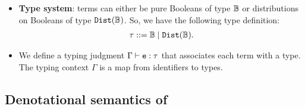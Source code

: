\documentclass{tufte-handout}
\begin{document}
\begin{itemize}
We can encode this scenario as a \disc{} program:

\begin{lstlisting}[mathescape=true]
x $\leftarrow$ flip 0.5; 
y $\leftarrow$ flip 0.5;
observe x $\lor$ y;
return x
\end{lstlisting}

This program outputs the probability distribution:
\begin{align*}
  [\true \mapsto (0.25 + 0.25) / 0.75, \false
\mapsto 0.25 / 0.75]
\end{align*} 

\item \textbf{Type system}: terms can either be pure Booleans of type $\mathbb{B}$ 
or distributions on Booleans of type $\mathtt{Dist}(\mathbb{B})$. So, we have the following 
type definition:
\begin{align}
  \tau ::= \mathbb{B} \mid \mathtt{Dist}(\mathbb{B}).
\end{align}

\item We define a typing judgment $\Gamma \vdash \texttt{e} : \tau$ that associates each 
term with a type. The typing context $\Gamma$ is a map from identifiers to types.

\end{itemize}



\subsection{Denotational semantics of \disc{}}
\end{document}
